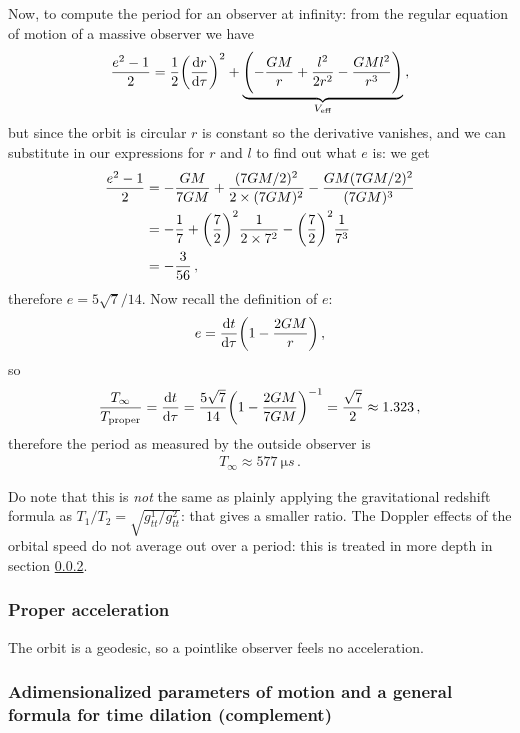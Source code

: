 \documentclass[main.tex]{subfiles}
\begin{document}
Now, to compute the period for an observer at infinity: from the regular equation of motion of a massive observer we have 
%
\begin{align}
  \frac{e^2-1}{2} = \frac{1}{2} \qty(\dv{r}{\tau })^2+ \underbrace{\qty(-\frac{GM}{r} + \frac{l^2}{2r^2} - \frac{GMl^2}{r^3})}_{V _{\text{eff}}}
\,,
\end{align}
%
but since the orbit is circular \(r\) is constant so the derivative vanishes, and we can substitute in our expressions for \(r\) and \(l\) to find out what \(e\) is: we get 
%
\begin{align}
  \frac{e^2-1}{2} &= - \frac{GM}{7GM} + \frac{(7GM/2)^2}{2\times (7GM)^2} - \frac{GM (7GM/2)^2}{(7GM)^3}  \\
&= - \frac{1}{7}+ \qty(\frac{7}{2})^2 \frac{1}{2\times 7^2} - \qty(\frac{7}{2})^2 \frac{1}{7^3}  \\
&= -\frac{3}{56}
\,,
\end{align}
%
therefore \(e = 5 \sqrt{7} / 14\). Now recall the definition of \(e\): 
%
\begin{align}
  e = \dv{t}{\tau } \qty(1 - \frac{2GM}{r}) 
\,,
\end{align}
%
so 
%
\begin{align}
  \frac{T_{ \infty }}{T _{\text{proper}}} = 
  \dv{t}{\tau } = \frac{5 \sqrt{7}}{14} \qty(1 - \frac{2GM}{7GM})^{-1} = \frac{\sqrt{7}}{2} \approx 1.323 
\,,
\end{align}
%
therefore the period as measured by the outside observer is 
%
\begin{align}
  T_{ \infty } \approx \SI{577}{\micro s}
\,.
\end{align}
%

Do note that this is \emph{not} the same as plainly applying the gravitational redshift formula as \(T_1 / T_2 = \sqrt{ g_{tt}^{1}/ g_{tt}^{2}}\): that gives a smaller ratio. The Doppler effects of the orbital speed do not average out over a period: this is treated in more depth in section \ref{sec:general-time-dilation}. 

\subsubsection{Proper acceleration}

The orbit is a geodesic, so a pointlike observer feels no acceleration. 

\subsubsection{Adimensionalized parameters of motion and a general formula for time dilation (complement)} \label{sec:general-time-dilation}
\end{document}
